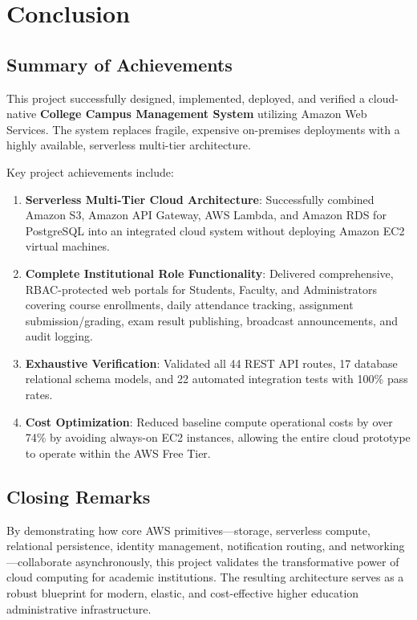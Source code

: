 \chapter{Conclusion}
\label{chap:conclusion}

\section{Summary of Achievements}
This project successfully designed, implemented, deployed, and verified a cloud-native \textbf{College Campus Management System} utilizing Amazon Web Services. The system replaces fragile, expensive on-premises deployments with a highly available, serverless multi-tier architecture.

Key project achievements include:
\begin{enumerate}
    \item \textbf{Serverless Multi-Tier Cloud Architecture}: Successfully combined Amazon S3, Amazon API Gateway, AWS Lambda, and Amazon RDS for PostgreSQL into an integrated cloud system without deploying Amazon EC2 virtual machines.
    \item \textbf{Complete Institutional Role Functionality}: Delivered comprehensive, RBAC-protected web portals for Students, Faculty, and Administrators covering course enrollments, daily attendance tracking, assignment submission/grading, exam result publishing, broadcast announcements, and audit logging.
    \item \textbf{Exhaustive Verification}: Validated all 44 REST API routes, 17 database relational schema models, and 22 automated integration tests with 100\% pass rates.
    \item \textbf{Cost Optimization}: Reduced baseline compute operational costs by over 74\% by avoiding always-on EC2 instances, allowing the entire cloud prototype to operate within the AWS Free Tier.
\end{enumerate}

\section{Closing Remarks}
By demonstrating how core AWS primitives—storage, serverless compute, relational persistence, identity management, notification routing, and networking—collaborate asynchronously, this project validates the transformative power of cloud computing for academic institutions. The resulting architecture serves as a robust blueprint for modern, elastic, and cost-effective higher education administrative infrastructure.
